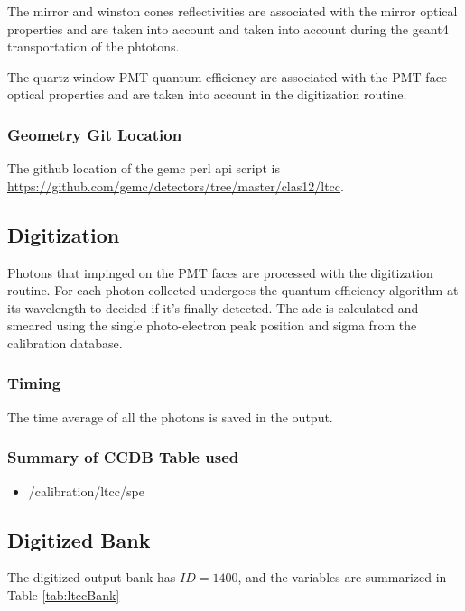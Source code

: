 The mirror and winston cones reflectivities are associated with the mirror optical properties and are taken into
account and taken into account during the geant4 transportation of the phtotons.

The quartz window PMT quantum efficiency are associated with the PMT face optical properties and are taken into account in
the digitization routine.

\subsubsection{Geometry Git Location}
The github location of the gemc perl api script is  \url{https://github.com/gemc/detectors/tree/master/clas12/ltcc}.


\subsection{Digitization}

Photons that impinged on the PMT faces are processed with the digitization routine.
For each photon collected undergoes the quantum efficiency algorithm at its wavelength to decided if it's finally detected.
The adc is calculated and smeared using the single photo-electron peak position and sigma from the calibration database.


\subsubsection{Timing}

The time average of all the photons is saved in the output.

\subsubsection{Summary of CCDB Table used}

\begin{itemize}
	\item /calibration/ltcc/spe
\end{itemize}

\subsection{Digitized Bank}

The digitized output bank has $ID=1400$, and the variables are summarized in Table \ref{tab:ltccBank}

